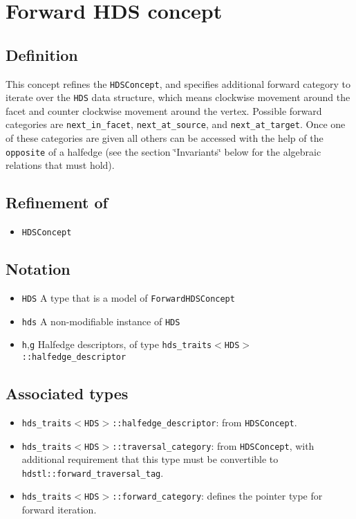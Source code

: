 \section{Forward HDS concept}\label{forwardhds}
\subsection{Definition}\label{forwardhds_refforwardhds1}
This concept refines the {\tt HDSConcept}, and specifies additional forward category to iterate over the {\tt HDS} data structure, which means clockwise movement around the facet and counter clockwise movement around the vertex. Possible forward categories are {\tt next\_\-in\_\-facet}, {\tt next\_\-at\_\-source}, and {\tt next\_\-at\_\-target}. Once one of these categories are given all others can be accessed with the help of the {\tt opposite} of a halfedge (see the section \char`\"{}Invariants\char`\"{} below for the algebraic relations that must hold).\subsection{Refinement of}\label{forwardhds_refforwardhds2}
\begin{itemize}
\item {\tt HDSConcept}\end{itemize}
\subsection{Notation}\label{forwardhds_refforwardhds3}
\begin{itemize}
\item {\tt HDS} A type that is a model of {\tt Forward\-HDSConcept}\item {\tt hds} A non-modifiable instance of {\tt HDS}\item {\tt h},{\tt g} Halfedge descriptors, of type {\tt hds\_\-traits$<$HDS$>$::halfedge\_\-descriptor}\end{itemize}
\subsection{Associated types}\label{forwardhds_refforwardhds4}
\begin{itemize}
\item {\tt hds\_\-traits$<$HDS$>$::halfedge\_\-descriptor}: from {\tt HDSConcept}.\item {\tt hds\_\-traits$<$HDS$>$::traversal\_\-category}: from {\tt HDSConcept}, with additional requirement that this type must be convertible to {\tt hdstl::forward\_\-traversal\_\-tag}.\item {\tt hds\_\-traits$<$HDS$>$::forward\_\-category}: defines the pointer type for forward iteration.\end{itemize}

